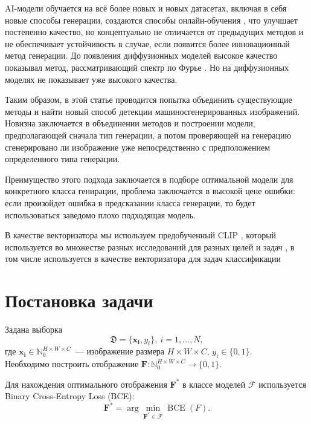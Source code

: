 \documentclass{article}
\begin{document}
AI-модели обучается на всё более новых и новых датасетах, включая в себя новые способы генерации, создаются способы онлайн-обучения \cite{OnlineDetection}, что улучшает постепенно качество, но концептуально не отличается от предыдущих методов и не обеспечивает устойчивость в случае, если появится более инновационный метод генерации. До появления диффузионных моделей высокое качество показывал метод, рассматривающий спектр по Фурье \cite{ZeroShot}. Но на диффузионных моделях не показывает уже высокого качества.

Таким образом, в этой статье проводится попытка объединить существующие методы и найти новый способ детекции машиносгенерированных изображений. Новизна заключается в объединении методов и построении модели, предполагающей сначала тип генерации, а потом проверяющей на генерацию сгенерировано ли изображение уже непосредственно с предположением определенного типа генерации.

Преимущество этого подхода заключается в подборе оптимальной модели для конкретного класса генирации, проблема заключается в высокой цене ошибки: если произойдет ошибка в предсказании класса генерации, то будет использоваться заведомо плохо подходящая модель.

В качестве векторизатора мы используем предобученный CLIP \cite{CLIP}, который используется во множестве разных исследований для разных целей и задач \cite{ForClip1, ForClip2, ForClip3}, в том числе используется в качестве векторизатора для задач классификации \cite{ForClip2, ForClip3}
\section{Постановка задачи}
\label{sec:problem_statement}
Задана выборка $$\mathfrak{D} = \{\bm{x_i}, y_i \},\ i= 1, ..., N,$$ где $\bm{x_i} \in \mathbb{N}_0^{H \times W \times C}$~--- изображение размера $H \times W \times C$, $y_i \in \{ 0, 1\}.$ \\

Необходимо построить отображение $\bm{F}: \mathbb{N}_0^{H \times W \times C} \rightarrow \{ 0, 1 \}.$

Для нахождения оптимального отображения \( \bm{F}^* \) в классе моделей \( \mathcal{F} \) используется Binary Cross-Entropy Loss (BCE):
\[
	\bm{F}^* = \arg\min_{\bm{F}^* \in \mathcal{F}} \operatorname{BCE}(F).
\]
\end{document}
